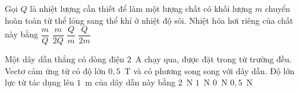 	\begin{ex}%
		Gọi $Q$ là nhiệt lượng cần thiết để làm một lượng chất có khối lượng $m$ chuyển hoàn toàn từ thể lỏng sang thể khí ở nhiệt độ sôi. Nhiệt hóa hơi riêng của chất này bằng
		\choice
		{$\dfrac{m}{Q}$}
		{$\dfrac{m}{2Q}$}
		{\True $\dfrac{Q}{m}$}
		{$\dfrac{Q}{2m}$}
	\end{ex}

	\begin{ex}%
		Một dây dẫn thẳng có dòng điện $2$~A chạy qua, được đặt trong từ trường đều. Vectơ cảm ứng từ có độ lớn $0{,}5$~T và có phương song song với dây dẫn. Độ lớn lực từ tác dụng lên $1$~m của dây dẫn này bằng
		\choice
		{$2$~N}
		{$1$~N}
		{\True $0$~N}
		{$0{,}5$~N}
	\end{ex}

